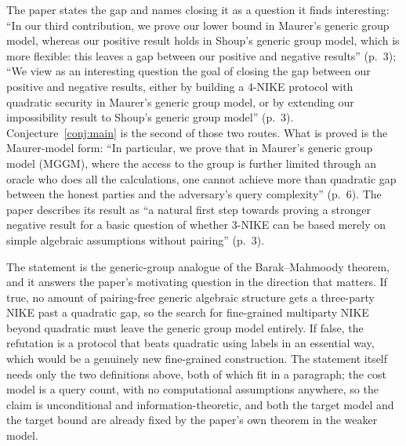 \documentclass{conjura-conjecture}
\begin{document}
\begin{remark}[Openness]\label{rem:open}
The paper states the gap and names closing it as a question it finds
interesting: ``In our third contribution, we prove our lower bound in
Maurer's generic group model, whereas our positive result holds in
Shoup's generic group model, which is more flexible: this leaves a gap
between our positive and negative results'' (p.~3); ``We view as an
interesting question the goal of closing the gap between our positive
and negative results, either by building a 4-NIKE protocol with
quadratic security in Maurer's generic group model, or by extending our
impossibility result to Shoup's generic group model'' (p.~3).
Conjecture~\ref{conj:main} is the second of those two routes. What is
proved is the Maurer-model form: ``In particular, we prove that in
Maurer's generic group model (MGGM), where the access to the group is
further limited through an oracle who does all the calculations, one
cannot achieve more than quadratic gap between the honest parties and
the adversary's query complexity'' (p.~6). The paper describes its
result as ``a natural first step towards proving a stronger negative
result for a basic question of whether 3-NIKE can be based merely on
simple algebraic assumptions without pairing'' (p.~3).
\end{remark}

\begin{remark}\label{rem:why}
The statement is the generic-group analogue of the Barak--Mahmoody
theorem, and it answers the paper's motivating question in the direction
that matters. If true, no amount of pairing-free generic algebraic
structure gets a three-party NIKE past a quadratic gap, so the search
for fine-grained multiparty NIKE beyond quadratic must leave the generic
group model entirely. If false, the refutation is a protocol that beats
quadratic using labels in an essential way, which would be a genuinely
new fine-grained construction. The statement itself needs only the two
definitions above, both of which fit in a paragraph; the cost model is a
query count, with no computational assumptions anywhere, so the claim is
unconditional and information-theoretic, and both the target model and
the target bound are already fixed by the paper's own theorem in the
weaker model.
\end{remark}
\end{document}
